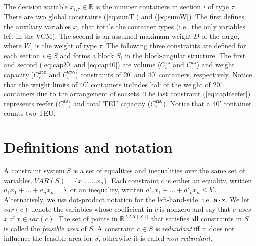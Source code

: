 \documentclass{llncs}
\newcommand{\var}{\mathit{var}}
\newcommand{\VAR}{\mathit{VAR}}
\newcommand{\trt}[1]{\texttt{#1}}
\newcommand{\ve}{\mathbf}
\begin{document}
The decision variable $x_{i,\tau} \in \mathbb{R}$ is the number containers in section $i$ of type $\tau$. There are two global constraints (\ref{eq:sumT}) and (\ref{eq:sumW}). The first defines the auxiliary variables $x_\tau$ that totals the container types (i.e., the only variables left in the VCM). The second is an assumed maximum weight $D$ of the cargo, where $W_\tau$ is the weight of type $\tau$. The following three constraints are defined for each section $i \in S$ and forms a block $S_i$ in the block-angular structure. The first and second (\ref{eq:cap20} and \ref{eq:cap40}) are volume ($C_i^\trt{20}$ and $C_i^\trt{40}$) and weight capacity ($C_i^\trt{W20}$ and $C_i^\trt{W20}$) constraints of 20' and 40' containers, respectively. Notice that the weight limits of 40' containers includes half of the weight of 20' containers due to the arrangement of sockets. The last constraint (\ref{eq:capReefer})  represents reefer ($C_i^\trt{RS}$) and total TEU capacity ($C_i^\trt{TEU}$). Notice that a 40' container counts two TEU.    


\section{Definitions and notation} \label{sec:notation}
A constraint system $S$ is a set of equalities and inequalities over the same set of variables, $\VAR(S)=\{x_1,\ldots, x_n\}$. Each constraint $c$ is either an equality, written $a_1x_1 + \ldots +a_nx_n = b$, or an inequality, written $a'_1x_1 + \ldots +a'_nx_n\leq b'$. Alternatively, we use dot-product notation for the left-hand-side, i.e. $\ve{a}\cdot \ve{x}$. 
We let $\var(c)$ denote the variables whose coefficient in $c$ is nonzero and say that $c$ \emph{uses} $x$ if $x\in \var(c)$. 
The set of points in $\mathbb{R}^{|\VAR(S)|}$ that satisfies all constraints in $S$ is called the \emph{feasible area} of $S$. A constraint $c\in S$ is \emph{redundant} iff it does not influence the feasible area for $S$, otherwise it is called \emph{non-redundant}.  
\end{document}
